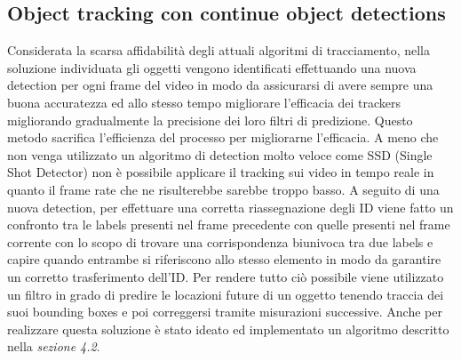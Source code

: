 \subsection{Object tracking con continue object detections}
Considerata la scarsa affidabilità degli attuali algoritmi di tracciamento, nella soluzione individuata gli oggetti vengono identificati effettuando una nuova detection per ogni frame del video in modo da assicurarsi di avere sempre una buona accuratezza ed allo stesso tempo migliorare l'efficacia dei trackers migliorando gradualmente la precisione dei loro filtri di predizione. Questo metodo sacrifica l'efficienza del processo per migliorarne l'efficacia. A meno che non venga utilizzato un algoritmo di detection molto veloce come SSD (Single Shot Detector)\cite{ssd} non è possibile applicare il tracking sui video in tempo reale in quanto il frame rate che ne risulterebbe sarebbe troppo basso. A seguito di una nuova detection, per effettuare una corretta riassegnazione degli ID viene fatto un confronto tra le labels presenti nel frame precedente con quelle presenti nel frame corrente con lo scopo di trovare una corrispondenza biunivoca tra due labels e capire quando entrambe si riferiscono allo stesso elemento in modo da garantire un corretto trasferimento dell'ID. Per rendere tutto ciò possibile viene utilizzato un filtro in grado di predire le locazioni future di un oggetto tenendo traccia dei suoi bounding boxes e poi correggersi tramite misurazioni successive. Anche per realizzare questa soluzione è stato ideato ed implementato un algoritmo descritto nella \textit{sezione 4.2}.
